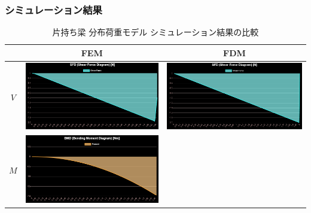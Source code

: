 \documentclass{jsarticle}
\begin{document}
\subsubsection{シミュレーション結果}
\begin{table}[H]
\begin{center}
\caption{片持ち梁 分布荷重モデル シミュレーション結果の比較}
\begin{tabular}{|c|c|c|}
\hline
 & FEM & FDM \\
\hline
\hline
$V$ &
\begin{minipage}{6truecm}
\centering
\includegraphics[width=6truecm]{cantilever_distributed_model_FEM_sf.PNG}
\end{minipage}
&
\begin{minipage}{6truecm}
\centering
\includegraphics[width=6truecm]{cantilever_distributed_model_FDM_sf.PNG}
\end{minipage}
\\
\hline
$M$ &
\begin{minipage}{6truecm}
\centering
\includegraphics[width=6cm]{cantilever_distributed_model_FEM_bm.PNG}

\end{minipage}
\end{tabular}
\end{center}
\end{table}
\end{document}
